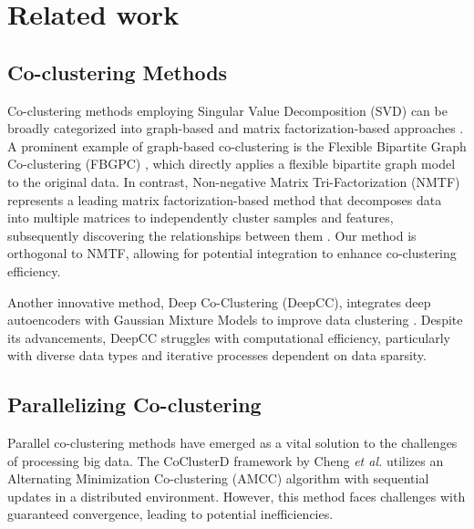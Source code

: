 
\section{Related work}
\label{sec:related_work}
\subsection{Co-clustering Methods}
Co-clustering methods employing Singular Value Decomposition (SVD) can be broadly categorized into graph-based and matrix factorization-based approaches
\cite{dhillon2001CoclusteringDocumentsWords}. A prominent example of graph-based co-clustering is the Flexible Bipartite Graph Co-clustering (FBGPC) \cite{chen2023FastFlexibleBipartitea}, which directly applies a flexible bipartite graph model to the original data. In contrast, Non-negative Matrix Tri-Factorization (NMTF) represents a leading matrix factorization-based method that decomposes data into multiple matrices to independently cluster samples and features, subsequently discovering the relationships between them \cite{long2005CoclusteringBlockValue}. Our method is orthogonal to NMTF, allowing for potential integration to enhance co-clustering efficiency.

Another innovative method, Deep Co-Clustering (DeepCC), integrates deep autoencoders with Gaussian Mixture Models to improve data clustering \cite{dongkuanxu2019DeepCoClustering}. Despite its advancements, DeepCC struggles with computational efficiency, particularly with diverse data types and iterative processes dependent on data sparsity.

\subsection{Parallelizing Co-clustering}

Parallel co-clustering methods have emerged as a vital solution to the challenges of processing big data. The CoClusterD framework by Cheng \textit{et al.} \cite{cheng2015CoClusterDDistributedFramework} utilizes an Alternating Minimization Co-clustering (AMCC) algorithm with sequential updates in a distributed environment. However, this method faces challenges with guaranteed convergence, leading to potential inefficiencies.

